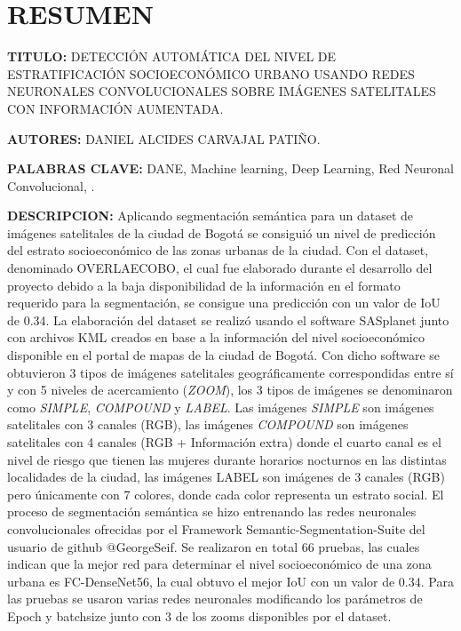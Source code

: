 	\setlength{\parskip}{\baselineskip} %


	\newpage\chapter*{RESUMEN}
    \textbf{TITULO:} DETECCIÓN AUTOMÁTICA DEL NIVEL DE ESTRATIFICACIÓN SOCIOECONÓMICO URBANO USANDO REDES NEURONALES CONVOLUCIONALES SOBRE IMÁGENES SATELITALES CON INFORMACIÓN AUMENTADA.
    
    \textbf{AUTORES:} DANIEL ALCIDES CARVAJAL PATIÑO.
    
    \textbf{PALABRAS CLAVE:} DANE, Machine learning, Deep Learning, Red Neuronal Convolucional, .	
    
    \textbf{DESCRIPCION:} Aplicando segmentación semántica para un dataset de imágenes satelitales de la ciudad de Bogotá se consiguió un nivel de predicción del estrato socioeconómico de las zonas urbanas de la ciudad. Con el dataset, denominado OVERLAECOBO, el cual fue elaborado durante el desarrollo del proyecto debido a la baja disponibilidad de la información en el formato requerido para la segmentación, se consigue una predicción con un valor de IoU de 0.34. La elaboración del dataset se realizó usando el software SASplanet junto con archivos KML creados en base a la información del nivel socioeconómico disponible en el portal de mapas de la ciudad de Bogotá. Con dicho software se obtuvieron 3 tipos de imágenes satelitales geográficamente correspondidas entre sí y con 5 niveles de acercamiento (\textit{ZOOM}), los 3 tipos de imágenes se denominaron como \textit{SIMPLE}, \textit{COMPOUND} y \textit{LABEL}. Las imágenes \textit{SIMPLE} son imágenes satelitales con 3 canales (RGB), las imágenes \textit{COMPOUND} son imágenes satelitales con 4 canales (RGB + Información extra) donde el cuarto canal es el nivel de riesgo que tienen las mujeres durante horarios nocturnos en las distintas localidades de la ciudad, las imágenes LABEL son imágenes de 3 canales (RGB) pero únicamente con 7 colores, donde cada color representa un estrato social. El proceso de segmentación semántica se hizo entrenando las redes neuronales convolucionales ofrecidas por el Framework Semantic-Segmentation-Suite del usuario de github @GeorgeSeif. Se realizaron en total 66 pruebas, las cuales indican que la mejor red para determinar el nivel socioeconómico de una zona urbana es FC-DenseNet56, la cual obtuvo el mejor IoU con un valor de 0.34. Para las pruebas se usaron varias redes neuronales modificando los parámetros de Epoch y batchsize junto con 3 de los zooms disponibles por el dataset. 
 
